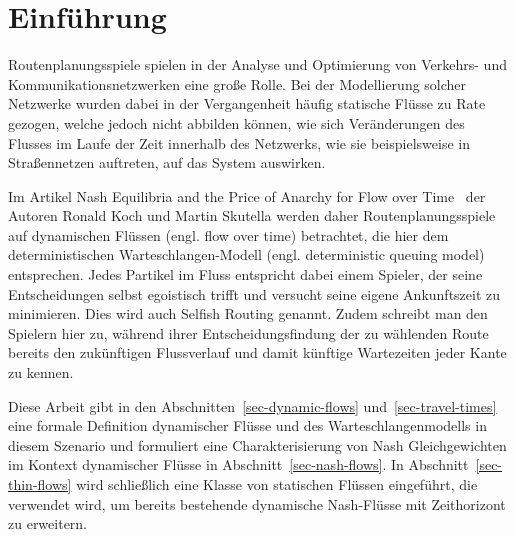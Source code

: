 \section{Einführung}\label{introduction}

Routenplanungsspiele spielen in der Analyse und Optimierung von Verkehrs- und Kommunikationsnetzwerken eine große Rolle.
Bei der Modellierung solcher Netzwerke wurden dabei in der Vergangenheit häufig statische Flüsse zu Rate gezogen, welche jedoch nicht abbilden können, wie sich Veränderungen des Flusses im Laufe der Zeit innerhalb des Netzwerks, wie sie beispielsweise in Straßennetzen auftreten, auf das System auswirken.

Im Artikel \glqq Nash Equilibria and the Price of Anarchy for Flow over Time\grqq\ \cite{Koch2011} der Autoren Ronald Koch und Martin Skutella werden daher Routenplanungsspiele auf dynamischen Flüssen (engl. flow over time) betrachtet, die hier dem deterministischen Warte\-schlangen-Modell (engl. deterministic queuing model) entsprechen.
Jedes Partikel im Fluss entspricht dabei einem Spieler, der seine Entscheidungen selbst egoistisch trifft und versucht seine eigene Ankunftszeit zu minimieren.
Dies wird auch Selfish Routing genannt.
Zudem schreibt man den Spielern hier zu, während ihrer Entscheidungsfindung der zu wählenden Route bereits den zukünftigen Flussverlauf und damit künftige Wartezeiten jeder Kante zu kennen.

Diese Arbeit gibt in den Abschnitten~\ref{sec-dynamic-flows} und~\ref{sec-travel-times} eine formale Definition dynamischer Flüsse und des Warteschlangenmodells in diesem Szenario und formuliert eine Charakterisierung von Nash Gleichgewichten im Kontext dynamischer Flüsse in Abschnitt~\ref{sec-nash-flows}.
In Abschnitt~\ref{sec-thin-flows} wird schließlich eine Klasse von statischen Flüssen eingeführt, die verwendet wird, um bereits bestehende dynamische Nash-Flüsse mit Zeithorizont zu erweitern.